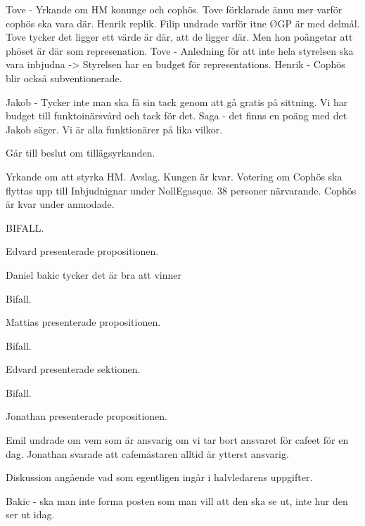 \documentclass[10pt]{article}
\begin{document}
\begin{paragrafer}
\begin{paragrafer}
        Tove - Yrkande om HM konunge och cophös.
        Tove förklarade ännu mer varför cophös ska vara där. Henrik replik. 
        Filip undrade varför itne ØGP är med delmål. Tove tycker det ligger ett värde är där, att de ligger där. Men hon poängetar att phöset är där som represenation.
        Tove - Anledning för att inte hela styrelsen ska vara inbjudna -> Styrelsen har en budget för representations. 
        Henrik - Cophös blir också subventionerade.

        Jakob - Tycker inte man ska få sin tack genom att gå gratis på sittning. Vi har budget till funktoinärsvård och tack för det. 
        Saga - det finns en poäng med det Jakob säger. Vi är alla funktionärer på lika vilkor. 

        Går till beslut om tillägsyrkanden. 

        Yrkande om att styrka HM. Avslag. Kungen är kvar.
        Votering om Cophös ska flyttas upp till Inbjudnignar under NollEgasque. 38 personer närvarande. 
      Cophös är kvar under anmodade. 

      BIFALL. 

      
      Edvard presenterade propositionen. 

      Daniel bakic tycker det är bra att vinner

      Bifall.


      Mattias presenterade propositionen. 

      Bifall.


      Edvard presenterade sektionen. 

      Bifall.



      Jonathan presenterade propositionen. 

      Emil undrade om vem som är ansvarig om vi tar bort ansvaret för cafeet för en dag. Jonathan svarade att cafemästaren alltid är ytterst ansvarig.
      
      Diskussion angående vad som egentligen ingår i halvledarens uppgifter. 
      
      Bakic - ska man inte forma posten som man vill att den ska se ut, inte hur den ser ut idag.


\end{paragrafer}
\end{paragrafer}
\end{document}

